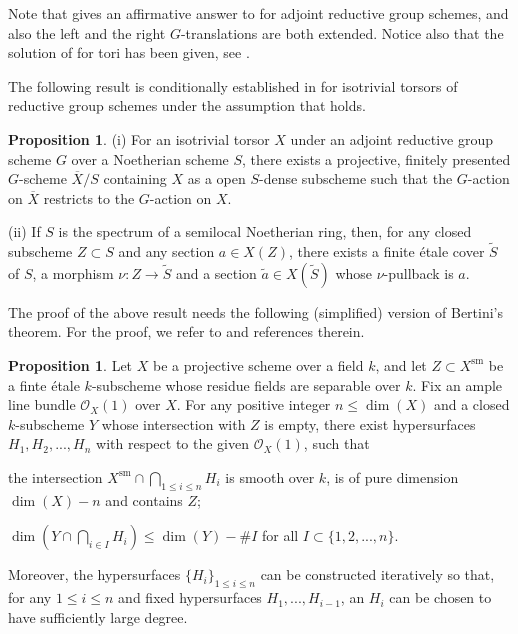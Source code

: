\documentclass[11pt, reqno]{amsart}
\theoremstyle{plain}
\theoremstyle{definition}
\newtheorem{proposition}[theorem]{Proposition}
\begin{document}
Note that  gives an affirmative answer to  for adjoint reductive group schemes, and also the left and the right $G$-translations are both extended. Notice also that the solution of  for tori has been given, see \cite[Theorem~6.3.1]{CKproblemtorsors}. 

The following result is conditionally established in \cite[Proposition~6.2.4]{CKproblemtorsors} for isotrivial torsors of reductive group schemes under the assumption that  holds. 

\begin{proposition}\label{compactificationtorsor}
    (i) For an isotrivial torsor $X$ under an adjoint reductive group scheme $G$ over a Noetherian scheme $S$, there exists a projective, finitely presented $G$-scheme $\overline{X}/ S$ containing $X$ as a open $S$-dense subscheme such that the $G$-action on $\overline{X}$ restricts to the $G$-action on $X$. 
    
    (ii) If $S$ is the spectrum of a semilocal Noetherian ring, then, for any closed subscheme $Z\subset S$ and any section $a\in X(Z)$, there exists a finite étale cover $\widetilde{S}$ of $S$, a morphism
    $\nu\colon Z\rightarrow\widetilde{S}$ and a section $\widetilde{a}\in X(\widetilde{S})$ whose $\nu$-pullback is $a$.
\end{proposition}

The proof of the above result needs the following (simplified) version of Bertini's theorem. For the proof, we refer to \cite[proof of Proposition~4.1.3]{CKproblemtorsors} and references therein.

\begin{proposition}\label{bertinitheorem}
    Let $X$ be a projective scheme over a field $k$, and let $Z\subset X^{\text{sm}}$ be a finte étale $k$-subscheme whose residue fields are separable over $k$. Fix an ample line bundle $\mathcal{O}_X(1)$ over $X$. For any positive integer $n\leq \dim(X)$ and a closed $k$-subscheme $Y$ whose intersection with $Z$ is empty, there exist hypersurfaces $H_1, H_2,..., H_n$ with respect to the given $\mathcal{O}_X(1)$, such that 
    \item[i)]  the intersection $X^{\text{sm}}\cap\bigcap_{1\leq i\leq n}H_i$ is smooth over $k$, is of pure dimension $\dim(X)-n$ and contains $Z$;
    \item[ii)] $\dim(Y\cap \bigcap_{i\in I}H_i)\leq \dim(Y)-\#I$ for all $I\subset\{1,2,...,n\}$.
    
    \noindent Moreover, the hypersurfaces $\{H_i\}_{1\leq i\leq n}$ can be constructed iteratively so that, for any $1\leq i\leq n$ and fixed hypersurfaces $H_1,...,H_{i-1}$, an $H_i$ can be chosen to have sufficiently large degree.
\end{proposition}
\end{document}
